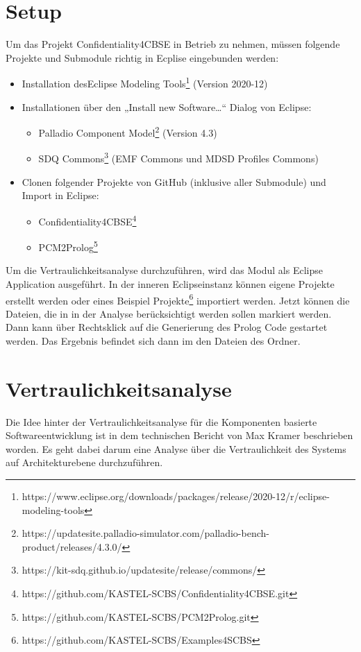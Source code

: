 \documentclass[twoside, ngerman]{sdqseminar}
\begin{document}
\section{Setup}
Um das Projekt Confidentiality4CBSE in Betrieb zu nehmen, müssen folgende Projekte und Submodule richtig in Ecplise eingebunden werden:
\begin{itemize}
	\item Installation desEclipse Modeling Tools\footnote{https://www.eclipse.org/downloads/packages/release/2020-12/r/eclipse-modeling-tools} (Version 2020-12)
	\item Installationen über den „Install new Software…“ Dialog von Eclipse:
	\begin{itemize}
		\item Palladio Component Model\footnote{https://updatesite.palladio-simulator.com/palladio-bench-product/releases/4.3.0/} (Version 4.3)
		\item SDQ Commons\footnote{https://kit-sdq.github.io/updatesite/release/commons/} (EMF Commons und MDSD Profiles Commons)
	\end{itemize} 
	\item Clonen folgender Projekte von GitHub (inklusive aller Submodule) und Import in Eclipse:
	\begin{itemize}
		\item Confidentiality4CBSE\footnote{https://github.com/KASTEL-SCBS/Confidentiality4CBSE.git}
		\item PCM2Prolog\footnote{https://github.com/KASTEL-SCBS/PCM2Prolog.git}
	\end{itemize}
\end{itemize}
Um die Vertraulichkeitsanalyse durchzuführen, wird das Modul  als Eclipse Application ausgeführt. In der inneren Eclipseinstanz können eigene Projekte erstellt werden oder eines Beispiel Projekte\footnote{https://github.com/KASTEL-SCBS/Examples4SCBS} importiert werden. Jetzt können die Dateien, die in in der Analyse berücksichtigt werden sollen markiert werden. Dann kann über Rechtsklick auf  die Generierung des Prolog Code gestartet werden. Das Ergebnis befindet sich dann im den  Dateien des  Ordner.

\section{Vertraulichkeitsanalyse}
Die Idee hinter der Vertraulichkeitsanalyse für die Komponenten basierte Softwareentwicklung ist in dem technischen Bericht\cite{kramer2017model} von Max Kramer beschrieben worden. Es geht dabei darum eine Analyse über die Vertraulichkeit des Systems auf Architekturebene durchzuführen.
\end{document}

